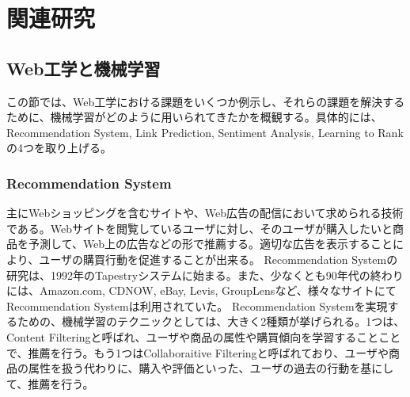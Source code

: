 \chapter{関連研究}
\section{Web工学と機械学習}
この節では、Web工学における課題をいくつか例示し、それらの課題を解決するために、機械学習がどのように用いられてきたかを概観する。具体的には、Recommendation System, Link Prediction, Sentiment Analysis, Learning to Rankの4つを取り上げる。

\subsection{Recommendation System}
主にWebショッピングを含むサイトや、Web広告の配信において求められる技術である。Webサイトを閲覧しているユーザに対し、そのユーザが購入したいと商品を予測して、Web上の広告などの形で推薦する。適切な広告を表示することにより、ユーザの購買行動を促進することが出来る。
Recommendation Systemの研究は、1992年のTapestryシステムに始まる\cite{goldberg1992using}。また、少なくとも90年代の終わりには、Amazon.com, CDNOW, eBay, Levis, GroupLensなど、様々なサイトにてRecommendation Systemは利用されていた\cite{resnick1997recommender}。
Recommendation Systemを実現するための、機械学習のテクニックとしては、大きく2種類が挙げられる\cite{koren2009matrix}。1つは、Content Filteringと呼ばれ、ユーザや商品の属性や購買傾向を学習することことで、推薦を行う。もう1つはCollaboraitive Filteringと呼ばれており、ユーザや商品の属性を扱う代わりに、購入や評価といった、ユーザの過去の行動を基にして、推薦を行う。

